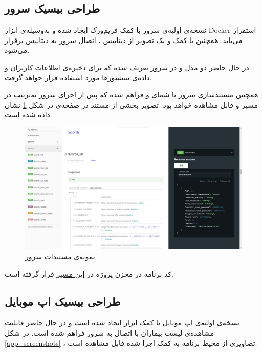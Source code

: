 \documentclass[12pt]{article}
\begin{document}
\subsection{طراحی بیسیک سرور}
نسخه‌ی اولیه‌ی سرور با کمک فریم‌ورک  ایجاد شده و به‌وسیله‌ی ابزار Docker استقرار می‌یابد. همچنین با کمک  و یک تصویر از دیتابیس ، اتصال سرور به دیتابیس برقرار می‌شود. 

در حال حاضر دو مدل  و  در سرور تعریف شده که برای ذخیره‌ی اطلاعات کاربران و داده‌ی سنسورها مورد استفاده قرار خواهد گرفت.

همچنین مستندسازی  سرور با شمای  و  فراهم شده که پس از اجرای سرور به‌ترتیب در مسیر  و  قابل مشاهده خواهد بود. تصویر بخشی از مستند در صفحه‌ی  در شکل \ref{redoc} نشان داده شده است.

\begin{figure}[h]
	\begin{center}
		\includegraphics[width=\textwidth]{redoc}
	\end{center}
	\caption{نمونه‌ی مستندات  سرور}
	\label{redoc}
\end{figure}

کد برنامه در مخزن پروژه در 
\href{https://github.com/Sharif-University-ESRLab/project-team-2/tree/main/Code/backend}{این مسیر}
قرار گرفته است.

\subsection{طراحی بیسیک اپ موبایل}
نسخه‌ی اولیه‌ی اپ موبایل با کمک ابزار  ایجاد شده است و در حال حاضر قابلیت مشاهده‌ی لیست بیماران با اتصال به سرور فراهم شده است.
در شکل
 \ref{app_screenshots}
، تصاویری از محیط برنامه به کمک  اجرا شده قابل مشاهده است.
\end{document}
